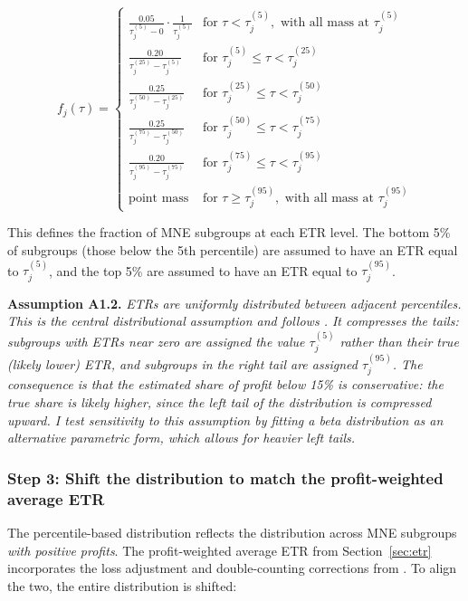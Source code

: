 \documentclass[11pt,a4paper]{article}
\newcommand{\assumption}[2]{\noindent\textbf{Assumption #1.} \textit{#2}\medskip}
\begin{document}
\begin{equation}\label{eq:piecewise}
f_j(\tau) = \begin{cases}
\frac{0.05}{\tau_j^{(5)} - 0} \cdot \frac{1}{\tau_j^{(5)}} & \text{for } \tau < \tau_j^{(5)}, \text{ with all mass at } \tau_j^{(5)} \\[6pt]
\frac{0.20}{\tau_j^{(25)} - \tau_j^{(5)}} & \text{for } \tau_j^{(5)} \leq \tau < \tau_j^{(25)} \\[6pt]
\frac{0.25}{\tau_j^{(50)} - \tau_j^{(25)}} & \text{for } \tau_j^{(25)} \leq \tau < \tau_j^{(50)} \\[6pt]
\frac{0.25}{\tau_j^{(75)} - \tau_j^{(50)}} & \text{for } \tau_j^{(50)} \leq \tau < \tau_j^{(75)} \\[6pt]
\frac{0.20}{\tau_j^{(95)} - \tau_j^{(75)}} & \text{for } \tau_j^{(75)} \leq \tau < \tau_j^{(95)} \\[6pt]
\text{point mass} & \text{for } \tau \geq \tau_j^{(95)}, \text{ with all mass at } \tau_j^{(95)}
\end{cases}
\end{equation}

This defines the fraction of MNE subgroups at each ETR level. The bottom 5\% of subgroups (those below the 5th percentile) are assumed to have an ETR equal to $\tau_j^{(5)}$, and the top 5\% are assumed to have an ETR equal to $\tau_j^{(95)}$.

\assumption{A1.2}{ETRs are uniformly distributed between adjacent percentiles. This is the central distributional assumption and follows \citet{hugger2025}. It compresses the tails: subgroups with ETRs near zero are assigned the value $\tau_j^{(5)}$ rather than their true (likely lower) ETR, and subgroups in the right tail are assigned $\tau_j^{(95)}$. The consequence is that the estimated share of profit below 15\% is \emph{conservative}: the true share is likely higher, since the left tail of the distribution is compressed upward. I test sensitivity to this assumption by fitting a beta distribution as an alternative parametric form, which allows for heavier left tails.}

\subsubsection{Step 3: Shift the distribution to match the profit-weighted average ETR}

The percentile-based distribution reflects the distribution across MNE subgroups \emph{with positive profits}. The profit-weighted average ETR from Section~\ref{sec:etr} incorporates the loss adjustment and double-counting corrections from \citet{hugger2025}. To align the two, the entire distribution is shifted:
\end{document}
